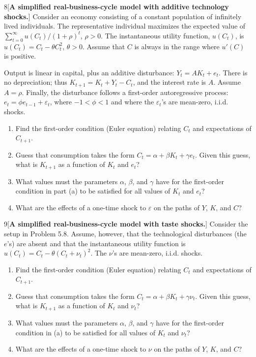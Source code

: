 \begin{problem}{8}[\textbf{A simplified real-business-cycle model with additive technology shocks.}]
Consider an economy consisting of a constant population of infinitely lived individuals. The representative individual maximizes the expected value of \(\sum_{t=0}^{\infty}u\left(C_t\right)/\left(1+\rho\right)^t\), \(\rho>0\). The instantaneous utility function, \(u\left(C_t\right)\), is \(u\left(C_t\right)=C_t-\theta C_t^2\), \(\theta>0\). Assume that \(C\) is always in the range where \(u'\left(C\right)\) is positive.

Output is linear in capital, plus an additive disturbance: \(Y_t=AK_t+e_t\). There is no depreciation; thus \(K_{t+1}=K_t+Y_t-C_t\), and the interest rate is \(A\). Assume \(A=\rho\). Finally, the disturbance follows a first-order autoregressive process: \(e_t=\phi e_{t-1}+\varepsilon_t\), where \(-1<\phi<1\) and where the \(\varepsilon_t\)'s are mean-zero, i.i.d. shocks.
\begin{enumerate}[label=(\alph*)]
    \item Find the first-order condition (Euler equation) relating \(C_t\) and expectations of \(C_{t+1}\).
    \item Guess that consumption takes the form \(C_t=\alpha+\beta K_t+\gamma e_t\). Given this guess, what is \(K_{t+1}\) as a function of \(K_t\) and \(e_t\)?
    \item What values must the parameters \(\alpha\), \(\beta\), and \(\gamma\) have for the first-order condition in part (a) to be satisfied for all values of \(K_t\) and \(e_t\)?
    \item What are the effects of a one-time shock to \(\varepsilon\) on the paths of \(Y\), \(K\), and \(C\)?
\end{enumerate}
\end{problem}

\begin{problem}{9}[\textbf{A simplified real-business-cycle model with taste shocks.}]
Consider the setup in Problem 5.8. Assume, however, that the technological disturbances (the \(e\)'s) are absent and that the instantaneous utility function is \(u\left(C_t\right)=C_t-\theta\left(C_t+\nu_t\right)^2\). The \(\nu\)'s are mean-zero, i.i.d. shocks.
\begin{enumerate}[label=(\alph*)]
    \item Find the first-order condition (Euler equation) relating \(C_t\) and expectations of \(C_{t+1}\).
    \item Guess that consumption takes the form \(C_t=\alpha+\beta K_t+\gamma\nu_t\). Given this guess, what is \(K_{t+1}\) as a function of \(K_t\) and \(\nu_t\)?
    \item What values must the parameters \(\alpha\), \(\beta\), and \(\gamma\) have for the first-order condition in (a) to be satisfied for all values of \(K_t\) and \(\nu_t\)?
    \item What are the effects of a one-time shock to \(\nu\) on the paths of \(Y\), \(K\), and \(C\)?
\end{enumerate}
\end{problem}

